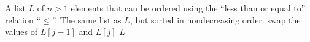 
\begin{algorithmic}[1]
\Require A list $L$ of $n > 1$ elements that can be ordered using the
  ``less than or equal to'' relation ``$\leq$''.
\Ensure The same list as $L$, but sorted in nondecreasing order.
      \State swap the values of $L[j-1]$ and $L[j]$\label{alg:bubble_sort:swap_values}
    \EndIf
  \EndFor
\EndFor
\State \Return $L$
\end{algorithmic}
